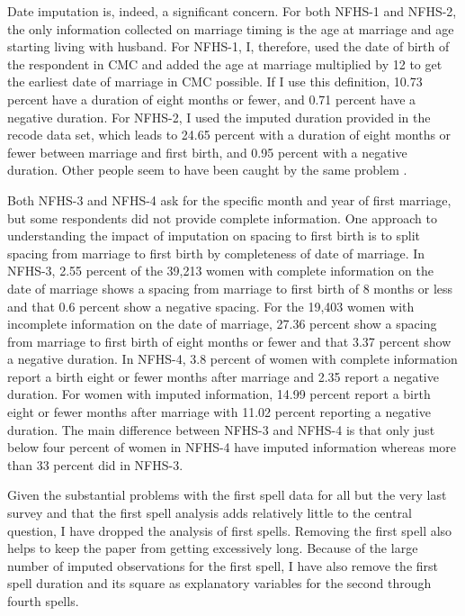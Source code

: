\documentclass[letterpaper,12pt]{article}
\begin{document}
\begin{enumerate}
[Response:]

Date imputation is, indeed, a significant concern.
For both NFHS-1 and NFHS-2, the only information collected on marriage timing is the age 
at marriage and age starting living with husband.
For NFHS-1, I, therefore, used the date of birth of the respondent in CMC and added the 
age at marriage multiplied by 12 to get the earliest date of marriage in CMC possible.
If I use this definition, 10.73 percent have a duration of eight months or fewer, 
and 0.71 percent have a negative duration.
For NFHS-2, I used the imputed duration provided in the recode data set, which leads to 
24.65 percent with a duration of eight months or fewer between marriage and first birth, 
and 0.95 percent with a negative duration.
Other people seem to have been caught by the same problem 
\citep[See, for example, ][]{Padmadas2004}.

Both NFHS-3 and NFHS-4 ask for the specific month and year of first marriage, but some
respondents did not provide complete information.
One approach to understanding the impact of imputation on spacing to first birth is to 
split spacing from marriage to first birth by completeness of date of marriage.
In NFHS-3, 2.55 percent of the 39,213 women with complete information on the date of 
marriage shows a spacing from marriage to first birth of 8 months or less and that 0.6 
percent show a negative spacing. 
For the 19,403 women with incomplete information on the date of marriage, 27.36 percent show
a spacing from marriage to first birth of eight months or fewer and that 3.37 percent show a 
negative duration.
In NFHS-4, 3.8 percent of women with complete information report a birth eight or fewer months
after marriage and 2.35 report a negative duration.
For women with imputed information, 14.99 percent report a birth eight or fewer months
after marriage with 11.02 percent reporting a negative duration.
The main difference between NFHS-3 and NFHS-4 is that only just below four percent of 
women in NFHS-4 have imputed information whereas more than 33 percent did in NFHS-3.

Given the substantial problems with the first spell data for all but the very last
survey and that the first spell analysis adds relatively little to the central question, 
I have dropped the analysis of first spells.
Removing the first spell also helps to keep the paper from getting excessively long.
Because of the large number of imputed observations for the first spell, I have also
remove the first spell duration and its square as explanatory variables for the second
through fourth spells.




\end{enumerate}
\end{document}
